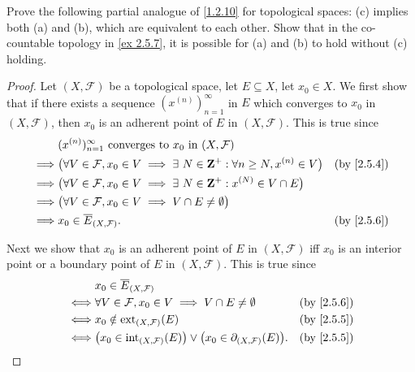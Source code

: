 \begin{exercise}\label{ex 2.5.10}
  Prove the following partial analogue of \cref{1.2.10} for topological spaces:
  (c) implies both (a) and (b), which are equivalent to each other.
  Show that in the co-countable topology in \cref{ex 2.5.7}, it is possible for (a) and (b) to hold without (c) holding.
\end{exercise}

\begin{proof}
  Let \((X, \mathcal{F})\) be a topological space, let \(E \subseteq X\), let \(x_0 \in X\).
  We first show that if there exists a sequence \((x^{(n)})_{n = 1}^\infty\) in \(E\) which converges to \(x_0\) in \((X, \mathcal{F})\), then \(x_0\) is an adherent point of \(E\) in \((X, \mathcal{F})\).
  This is true since
  \begin{align*}
             & (x^{(n)})_{n = 1}^\infty \text{ converges to } x_0 \text{ in } (X, \mathcal{F})                                                          \\
    \implies & \big(\forall V \in \mathcal{F}, x_0 \in V \implies \exists\ N \in \Z^+ : \forall n \geq N, x^{(n)} \in V\big) & \text{(by \cref{2.5.4})} \\
    \implies & \big(\forall V \in \mathcal{F}, x_0 \in V \implies \exists\ N \in \Z^+ : x^{(N)} \in V \cap E\big)                                       \\
    \implies & \big(\forall V \in \mathcal{F}, x_0 \in V \implies V \cap E \neq \emptyset\big)                                                          \\
    \implies & x_0 \in \overline{E}_{(X, \mathcal{F})}.                                                                      & \text{(by \cref{2.5.6})}
  \end{align*}

  Next we show that \(x_0\) is an adherent point of \(E\) in \((X, \mathcal{F})\) iff \(x_0\) is an interior point or a boundary point of \(E\) in \((X, \mathcal{F})\).
  This is true since
  \begin{align*}
         & x_0 \in \overline{E}_{(X, \mathcal{F})}                                                                                              \\
    \iff & \forall V \in \mathcal{F}, x_0 \in V \implies V \cap E \neq \emptyset                                     & \text{(by \cref{2.5.6})} \\
    \iff & x_0 \notin \text{ext}_{(X, \mathcal{F})}(E)                                                               & \text{(by \cref{2.5.5})} \\
    \iff & \big(x_0 \in \text{int}_{(X, \mathcal{F})}(E)\big) \lor \big(x_0 \in \partial_{(X, \mathcal{F})}(E)\big). & \text{(by \cref{2.5.5})}
  \end{align*}


\end{proof}
